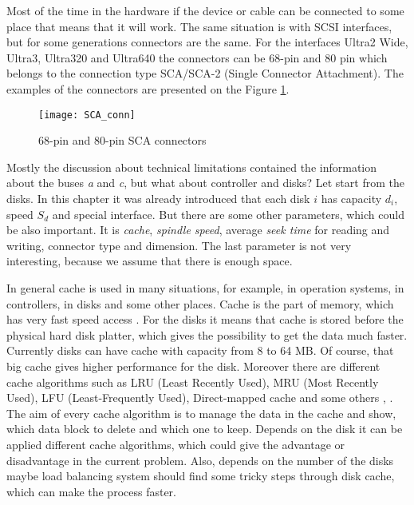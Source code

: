 Most of the time in the hardware if the device or cable can be connected to some place that means that it will work. The same situation is with SCSI interfaces, but for some generations connectors are the same. For the interfaces Ultra2 Wide, Ultra3, Ultra320 and Ultra640 the connectors can be 68-pin and 80 pin which belongs to the connection type SCA/SCA-2 (Single Connector Attachment). The examples of the connectors are presented on the Figure \ref{fig:SCA_conn}.
\begin{figure}[h]
\begin{center}
	\label{fig:SCA_conn}
  \texttt{[image: SCA\_conn]}
\end{center}
  \caption{68-pin and 80-pin SCA connectors}
  \label{fig:SCA_conn}
\end{figure}


Mostly the discussion about technical limitations contained the information about the buses \emph{a} and \emph{c}, but what about controller and disks? Let start from the disks. In this chapter it was already introduced that each disk $i$ has capacity $d_i$, speed $S_d$ and special interface. But there are some other parameters, which could be also important. It is \emph{cache}, \emph{spindle speed}, average \emph{seek time} for reading and writing, connector type and dimension. The last parameter is not very interesting, because we assume that there is enough space.

In general cache is used in many situations, for example, in operation systems, in controllers, in disks and some other places. Cache is the part of memory, which has very fast speed access \cite{intro_scsi_perform}. For the disks it means that cache is stored before the physical hard disk platter, which gives the possibility to get the data much faster. Currently disks can have cache with capacity from 8 to 64 MB. Of course, that big cache gives higher performance for the disk. Moreover there are different cache algorithms such as LRU (Least Recently Used), MRU (Most Recently Used), LFU (Least-Frequently Used), Direct-mapped cache and some others \cite{cache_alg}, \cite{cache_strategies}. The aim of every cache algorithm is to manage the data in the cache and show, which data block to delete and which one to keep. Depends on the disk it can be applied different cache algorithms, which could give the advantage or disadvantage in the current problem. Also, depends on the number of the disks maybe load balancing system should find some tricky steps through disk cache, which can make the process faster.

